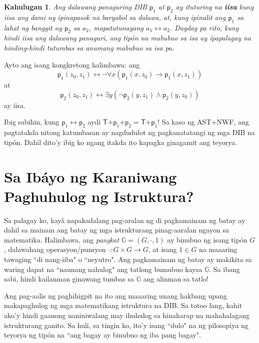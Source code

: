 \documentclass{article}
\newtheorem{definition}{Kahulugan}[section]
\begin{document}
\begin{definition}
\label{tumbasan}
Ang dalawang panaguring DIB $\textsf{p}_1$ at $\textsf{p}_2$ ay ituturing na \textbf{iisa} kung iisa ang dami ng ipinapasok na baryabol sa dalawa, at, kung ipinalit ang $\textsf{p}_1$ sa lahat ng banggit ng $\textsf{p}_2$ sa $a_2$, mapatutunayang $a_1 \leftrightarrow a_2$. Dagdag pa rito, kung hindi iisa ang dalawang panaguri, ang tipón na mabubuo sa isa ay ípapalagay na hinding-hindi tutumbas sa anumang mabubuo sa isa pa.
\end{definition}

Ayto ang isang kongkretong halimbawa: ang $$\textsf{p}_1(z_0, z_1) \leftrightarrow \neg\forall x(\textsf{p}_1(x, z_0) \rightarrow \textsf{p}_1(x, z_1))$$ at $$\textsf{p}_2(z_0, z_1) \leftrightarrow \exists y(\neg \textsf{p}_2(y, z_1) \wedge \textsf{p}_2(y, z_0))$$ ay iisa.

Ibig sabihin, kung $\textsf{p}_1 \leftrightarrow \textsf{p}_2$ aydi $\textsf{T+}\textsf{p}_1\textsf{+p}_2 = \textsf{T+}\textsf{p}_1$! Sa kaso ng \textsf{AST+NWF}, ang pagtatakda nitong katumbasan ay nagdudulot ng pagkanatatangi ng mga DIB na tipón. Dahil dito'y ibig ko ngang itakda ito kapagka ginagamit ang teyorya.

\section{Sa Ibáyo ng Karaniwang Paghuhulog ng Istruktura?}

Sa palagay ko, kayâ napakadalang pag-aralan ng di pagkamainam ng batay ay dahil sa mainam ang batay ng mga istrukturang pinag-aaralan ngayon sa matematika. Halimbawa, ang \textit{pangkat} $\mathbb{G} = (G, \cdot, 1)$ ay binubuo ng isang tipón $G$, dalawahang operasyon/punsyon $\cdot:G \times G \rightarrow G$, at isang $1 \in G$ na maaaring tawaging ``di nang-iiba" o ``neyutro". Ang pagkamainam ng batay ay makikita sa waring dapat na ``naunang nahulog" ang tatlong bumubuo kaysa $\mathbb{G}$. Sa ibang sabi, hindi kailanman ginawang tumbas sa $\mathbb{G}$ ang alinman sa tatlo!

Ang pag-aalis ng paghihigpit na ito ang maaaring unang hakbang upang makapaghulog ng mga matematikang istruktura na DIB. Sa totoo lang, kahit ako'y hindi gaanong naniniwalang may ihuhulog sa hinaharap na mahahalagang istrukturang ganito. Sa huli, sa tingin ko, ito'y isang ``dulo" na ng pilosopiya ng teyorya ng tipón na ``ang bagay ay binubuo ng iba pang bagay". 



\end{document}

